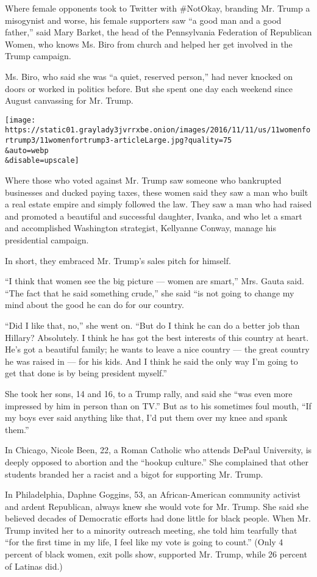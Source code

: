 Where female opponents took to Twitter with \#NotOkay, branding Mr.
Trump a misogynist and worse, his female supporters saw ``a good man and
a good father,'' said Mary Barket, the head of the Pennsylvania
Federation of Republican Women, who knows Ms. Biro from church and
helped her get involved in the Trump campaign.

Ms. Biro, who said she was ``a quiet, reserved person,'' had never
knocked on doors or worked in politics before. But she spent one day
each weekend since August canvassing for Mr. Trump.

\texttt{[image: https://static01.graylady3jvrrxbe.onion/images/2016/11/11/us/11womenfortrump3/11womenfortrump3-articleLarge.jpg?quality=75\\\&auto=webp\\\&disable=upscale]}

Where those who voted against Mr. Trump saw someone who bankrupted
businesses and ducked paying taxes, these women said they saw a man who
built a real estate empire and simply followed the law. They saw a man
who had raised and promoted a beautiful and successful daughter, Ivanka,
and who let a smart and accomplished Washington strategist, Kellyanne
Conway, manage his presidential campaign.

In short, they embraced Mr. Trump's sales pitch for himself.

``I think that women see the big picture --- women are smart,'' Mrs.
Gauta said. ``The fact that he said something crude,'' she said ``is not
going to change my mind about the good he can do for our country.

``Did I like that, no,'' she went on. ``But do I think he can do a
better job than Hillary? Absolutely. I think he has got the best
interests of this country at heart. He's got a beautiful family; he
wants to leave a nice country --- the great country he was raised in ---
for his kids. And I think he said the only way I'm going to get that
done is by being president myself.''

She took her sons, 14 and 16, to a Trump rally, and said she ``was even
more impressed by him in person than on TV.'' But as to his sometimes
foul mouth, ``If my boys ever said anything like that, I'd put them over
my knee and spank them.''

In Chicago, Nicole Been, 22, a Roman Catholic who attends DePaul
University, is deeply opposed to abortion and the ``hookup culture.''
She complained that other students branded her a racist and a bigot for
supporting Mr. Trump.

In Philadelphia, Daphne Goggins, 53, an African-American community
activist and ardent Republican, always knew she would vote for Mr.
Trump. She said she believed decades of Democratic efforts had done
little for black people. When Mr. Trump invited her to a minority
outreach meeting, she told him tearfully that ``for the first time in my
life, I feel like my vote is going to count.'' (Only 4 percent of black
women, exit polls show, supported Mr. Trump, while 26 percent of Latinas
did.)

